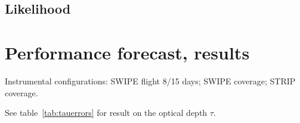 \subsection{Likelihood}

\section{Performance forecast, results}\label{sec:results}

Instrumental configurations: SWIPE flight 8/15 days; SWIPE coverage; STRIP coverage.


See table~\ref{tab:tauerrors} for result on the optical depth $\tau$. 

%


